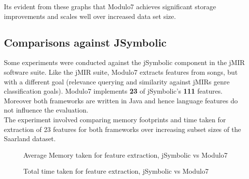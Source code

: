 \documentclass{article}
\begin{document}
\noindent Its evident from these graphs that Modulo7 achieves significant storage improvements and scales well over increased data set size.   

\subsection{Comparisons against JSymbolic}

Some experiments were conducted against the jSymbolic component in the jMIR \cite{jMIR} software suite. Like the jMIR suite, Modulo7 extracts features from songs, but with a different goal (relevance querying and similarity against jMIRs genre classification goals). Modulo7 implements \textbf{23} of jSymbolic's \textbf{111} features. Moreover both frameworks are written in Java and hence language features do not influence the evaluation. \\ 

\noindent The experiment involved comparing memory footprints and time taken for extraction of 23 features for both frameworks over increasing subset sizes of the Saarland \cite{saarlandmsd} dataset. 

\begin{figure}[h]
\begin{center}
{}
 \caption{Average Memory taken for feature extraction, jSymbolic vs Modulo7}
 \label{fig:MemoryTaken}
\end{center}
\end{figure}

\begin{figure}[h]
\begin{center}
{}
 \caption{Total time taken for feature extraction, jSymbolic vs Modulo7}
 \label{fig:TimeTaken}
\end{center}
\end{figure}
\end{document}
